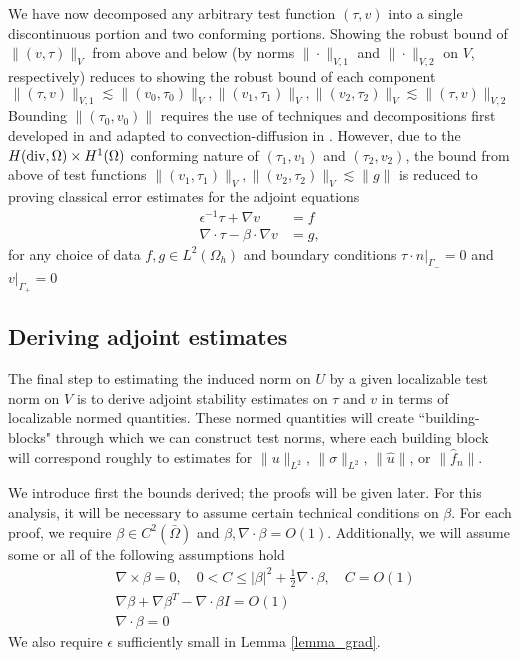 \documentclass[11pt,onecolumn]{scrartcl}
\newcommand{\grad}{\nabla}
\newcommand{\curl}{\grad \times}
\renewcommand{\div}{\grad \cdot}
\begin{document}
We have now decomposed any arbitrary test function $\left(\tau,v\right)$ into a single discontinuous portion and two conforming portions.  Showing the robust bound of $\|\left(v,\tau\right)\|_V$ from above and below (by norms $\|\cdot \|_{V,1}$ and $\|\cdot \|_{V,2}$ on $V$, respectively) reduces to showing the robust bound of each component 
\[
\|\left(\tau,v\right)\|_{V,1} \lesssim \|\left(v_{0},\tau_{0}\right)\|_V, \|\left(v_{1},\tau_{1}\right)\|_V, \|\left(v_{2},\tau_{2}\right)\|_V \lesssim \|\left(\tau,v\right)\|_{V,2}
\]
Bounding $\|\left(\tau_0,v_0\right)\|$ requires the use of techniques and decompositions first developed in \cite{analysisDPG} and adapted to convection-diffusion in \cite{DPGrobustness}.  However, due to the $H({\rm div}, \Omega)\times H^1(\Omega)$ conforming nature of $\left(\tau_1,v_1\right)$ and $\left(\tau_2,v_2\right)$, the bound from above of test functions $\|\left(v_{1},\tau_{1}\right)\|_V, \|\left(v_{2},\tau_{2}\right)\|_V \lesssim \|g\|$ is reduced to proving classical error estimates for the adjoint equations
\begin{align}
\epsilon^{-1}\tau + \grad v &= f \label{adjoint1}\\
\div \tau - \beta\cdot \grad v &=  g, \label{adjoint2}
\end{align} 
for any choice of data $f, g\in L^2({\Omega_h})$ and boundary conditions $\left.\tau\cdot n\right|_{\Gamma_-} = 0$ and $\left.v\right|_{\Gamma_+} = 0$ 

\subsection{Deriving adjoint estimates}
\label{sec:strategy3}

The final step to estimating the induced norm on $U$ by a given localizable test norm on $V$ is to derive adjoint stability estimates on $\tau$ and $v$ in terms of localizable normed quantities.  These normed quantities will create ``building-blocks" through which we can construct test norms, where each building block will correspond roughly to estimates for $\|u\|_{L^2}$, $\|\sigma\|_{L^2}$, $\|\widehat{u}\|$, or $\|\widehat{f}_n\|$.  

We introduce first the bounds derived; the proofs will be given later. For this analysis, it will be necessary to assume certain technical conditions on $\beta$.  For each proof, we require $\beta \in C^2(\bar{\Omega})$ and $\beta, \div \beta = O(1)$.  Additionally, we will assume some or all of the following assumptions hold
\begin{align}
&\curl \beta = 0, \quad 0<C \leq \left | \beta\right |^2 + \frac{1}{2}\div \beta, \quad C = O(1) \label{a_req}\\
&\grad \beta + \grad \beta ^T - \div \beta I = O(1) \label{b_req}\\
&\div \beta = 0 \label{c_req}
\end{align}
We also require $\epsilon$ sufficiently small in Lemma \ref{lemma_grad}.  
\end{document}
